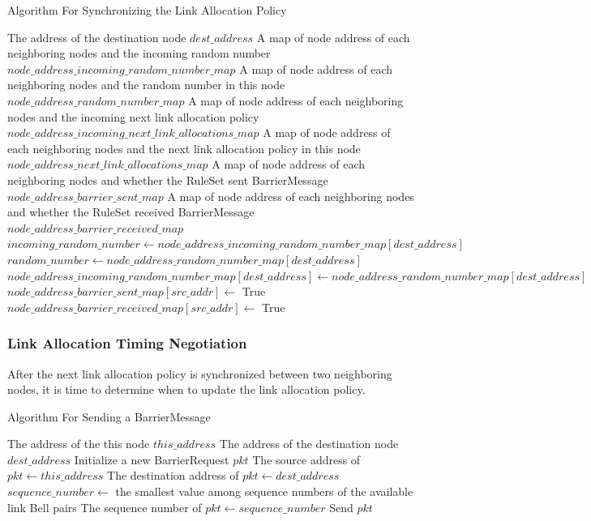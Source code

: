 \begin{algorithm}[H]  
  \caption{Algorithm For Synchronizing the Link Allocation Policy}                 
  \begin{algorithmic}[1]
    \Require The address of the destination node $dest\_address$
    \Require A map of node address of each neighboring nodes and the incoming random number $node\_address\_incoming\_random\_number\_map$
    \Require A map of node address of each neighboring nodes and the random number in this node $node\_address\_random\_number\_map$
    \Require  A map of node address of each neighboring nodes and the incoming next link allocation policy $node\_address\_incoming\_next\_link\_allocations\_map$
    \Require  A map of node address of each neighboring nodes and the next link allocation policy in this node $node\_address\_next\_link\_allocations\_map$
    \Require  A map of node address of each neighboring nodes and whether the RuleSet sent BarrierMessage $node\_address\_barrier\_sent\_map$
    \Require  A map of node address of each neighboring nodes and whether the RuleSet received BarrierMessage $node\_address\_barrier\_received\_map$
    \State $incoming\_random\_number \gets node\_address\_incoming\_random\_number\_map[dest\_address]$
    \State $random\_number \gets node\_address\_random\_number\_map[dest\_address]$
      \State $node\_address\_incoming\_random\_number\_map[dest\_address] \gets node\_address\_random\_number\_map[dest\_address]$
    \EndIf
    \State $node\_address\_barrier\_sent\_map[src\_addr] \gets$ True
    \State $node\_address\_barrier\_received\_map[src\_addr] \gets$ True
  \end{algorithmic}
\end{algorithm}

\subsubsection{Link Allocation Timing Negotiation}

After the next link allocation policy is synchronized between two neighboring nodes, it is time to determine when to update the link allocation policy.
\begin{algorithm}[H]  
  \caption{Algorithm For Sending a BarrierMessage}             
  \begin{algorithmic}[1]
    \Require The address of the this node $this\_address$      
    \Require The address of the destination node $dest\_address$    
    \State Initialize a new BarrierRequest $pkt$
    \State The source address of $pkt \gets this\_address$
    \State The destination address of $pkt \gets dest\_address$
    \State $sequence\_number \gets$ the smallest value among sequence numbers of the available link Bell pairs
    \State The sequence number of $pkt \gets sequence\_number$
    \State Send $pkt$
  \end{algorithmic}
\end{algorithm}

